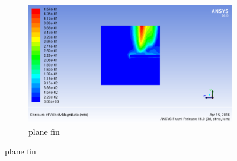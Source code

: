  \begin{figure}[h]
 	\centering
 	\begin{subfigure}[b]{0.5\textwidth}
 		\includegraphics[width=\textwidth]{111.png}
 		\caption{plane fin}
 		\label{fig:structured}
 	\end{subfigure}%
 	

\end{figure}
